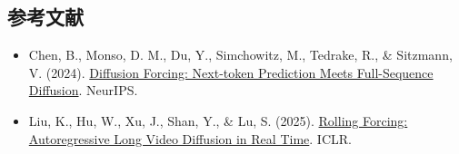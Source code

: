\FloatBarrier
{}
\hypertarget{ux53c2ux8003ux6587ux732e-142}{%
\subsection{参考文献}\label{ux53c2ux8003ux6587ux732e-142}}

\vspace{0.25em}
\begin{itemize}
\tightlist
\item
  Chen, B., Monso, D. M., Du, Y., Simchowitz, M., Tedrake, R., \& Sitzmann, V. (2024). \href{https://arxiv.org/abs/2407.01392}{Diffusion Forcing: Next-token Prediction Meets Full-Sequence Diffusion}. NeurIPS.
\item
  Liu, K., Hu, W., Xu, J., Shan, Y., \& Lu, S. (2025). \href{https://arxiv.org/abs/2509.25161}{Rolling Forcing: Autoregressive Long Video Diffusion in Real Time}. ICLR.
\end{itemize}

\clearpage
